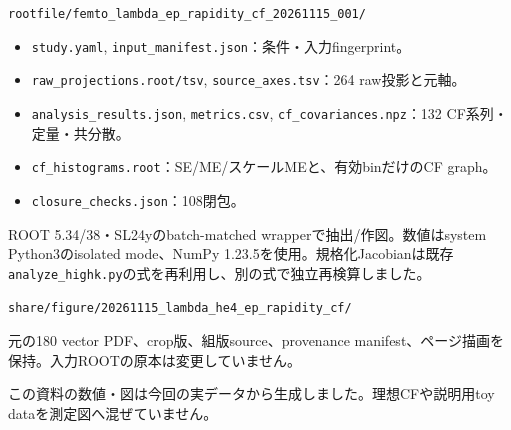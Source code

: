 \documentclass[11pt,a4paper]{article}
\newcommand{\sub}[1]{\par\vspace{2mm}{\bfseries\color{teal}#1}\par}
\newcommand{\figcap}[1]{{\fontsize{9.2}{12.5}\selectfont\color{navy!75}#1\par}}
\begin{document}
{\small\texttt{rootfile/femto\_lambda\_ep\_rapidity\_cf\_20261115\_001/}}

\begin{itemize}\item \texttt{study.yaml}, \texttt{input\_manifest.json}：条件・入力fingerprint。\item \texttt{raw\_projections.root/tsv}, \texttt{source\_axes.tsv}：264 raw投影と元軸。\item \texttt{analysis\_results.json}, \texttt{metrics.csv}, \texttt{cf\_covariances.npz}：132 CF系列・定量・共分散。\item \texttt{cf\_histograms.root}：SE/ME/スケールMEと、有効binだけのCF graph。\item \texttt{closure\_checks.json}：108閉包。\end{itemize}

\sub{計算と表示}

ROOT 5.34/38・SL24yのbatch-matched wrapperで抽出/作図。数値はsystem Python3のisolated mode、NumPy 1.23.5を使用。規格化Jacobianは既存\texttt{analyze\_highk.py}の式を再利用し、別の式で独立再検算しました。

\sub{図とPDF}

{\small\texttt{share/figure/20261115\_lambda\_he4\_ep\_rapidity\_cf/}}

元の180 vector PDF、crop版、組版source、provenance manifest、ページ描画を保持。入力ROOTの原本は変更していません。

\figcap{この資料の数値・図は今回の実データから生成しました。理想CFや説明用toy dataを測定図へ混ぜていません。}

\label{reportend}
\end{document}
